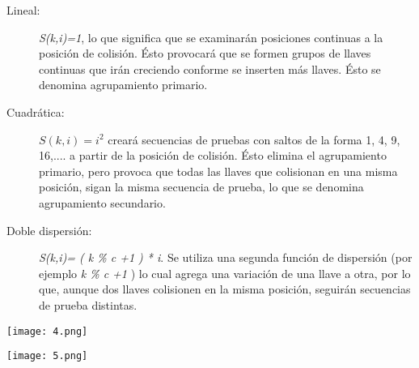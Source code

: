 \begin{description}
\item[Lineal: ] \textit{S(k,i)=1}, lo que significa que se examinarán
  posiciones continuas a la posición de colisión.  Ésto provocará que
  se formen grupos de llaves continuas que irán creciendo conforme se
  inserten más llaves.  Ésto se denomina agrupamiento primario.
\item[Cuadrática: ] $S(k,i)=i^2$ creará secuencias de pruebas con saltos
  de la forma 1, 4, 9, 16,.... a partir de la posición de colisión.
  Ésto elimina el agrupamiento primario, pero provoca que todas las
  llaves que colisionan en una misma posición, sigan la misma
  secuencia de prueba, lo que se denomina agrupamiento secundario.
\item[Doble dispersión: ] \textit{S(k,i)= ( k \% c +1 ) * i}.  Se
  utiliza una segunda función de dispersión (por ejemplo \textit{k \%
    c +1} ) lo cual agrega una variación de una llave a otra, por lo
  que, aunque dos llaves colisionen en la misma posición, seguirán
  secuencias de prueba distintas.
\end{description}

\begin{center}
  \texttt{[image: 4.png]}
\end{center}

\begin{center}
  \texttt{[image: 5.png]}
\end{center}

